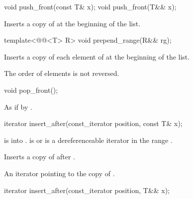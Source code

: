 %
\begin{itemdecl}
void push_front(const T& x);
void push_front(T&& x);
\end{itemdecl}

\begin{itemdescr}
\pnum
\effects
Inserts a copy of  at the beginning of the list.
\end{itemdescr}

%
\begin{itemdecl}
template<@@<T> R>
  void prepend_range(R&& rg);
\end{itemdecl}

\begin{itemdescr}
\pnum
\effects
Inserts a copy of each element of  at the beginning of the list.
\begin{note}
The order of elements is not reversed.
\end{note}
\end{itemdescr}

%
\begin{itemdecl}
void pop_front();
\end{itemdecl}

\begin{itemdescr}
\pnum
\effects
As if by .
\end{itemdescr}

%
\begin{itemdecl}
iterator insert_after(const_iterator position, const T& x);
\end{itemdecl}

\begin{itemdescr}
\pnum
\expects
{} is  into .
 is  or is a dereferenceable
iterator in the range .

\pnum
\effects
Inserts a copy of  after .

\pnum
\returns
An iterator pointing to the copy of .
\end{itemdescr}

%
\begin{itemdecl}
iterator insert_after(const_iterator position, T&& x);
\end{itemdecl}

